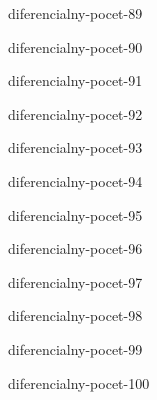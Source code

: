 \begin{defproblem}{diferencialny-pocet-89}

\end{defproblem}

\begin{defproblem}{diferencialny-pocet-90}

\end{defproblem}

\begin{defproblem}{diferencialny-pocet-91}

\end{defproblem}

\begin{defproblem}{diferencialny-pocet-92}

\end{defproblem}

\begin{defproblem}{diferencialny-pocet-93}

\end{defproblem}

\begin{defproblem}{diferencialny-pocet-94}

\end{defproblem}

\begin{defproblem}{diferencialny-pocet-95}

\end{defproblem}

\begin{defproblem}{diferencialny-pocet-96}

\end{defproblem}

\begin{defproblem}{diferencialny-pocet-97}

\end{defproblem}

\begin{defproblem}{diferencialny-pocet-98}

\end{defproblem}

\begin{defproblem}{diferencialny-pocet-99}

\end{defproblem}

\begin{defproblem}{diferencialny-pocet-100}

\end{defproblem}

